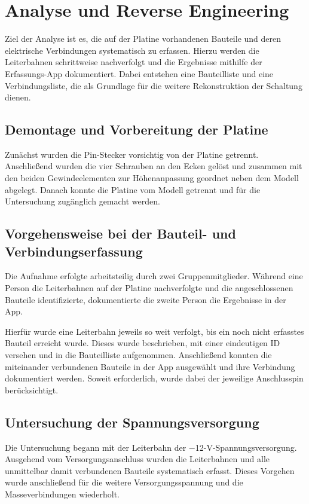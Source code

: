 \chapter{Analyse und Reverse Engineering}\label{ch:analyse-und-reverse-engineering}
Ziel der Analyse ist es, die auf der Platine vorhandenen Bauteile und deren elektrische Verbindungen systematisch zu erfassen.
Hierzu werden die Leiterbahnen schrittweise nachverfolgt und die Ergebnisse mithilfe der Erfassungs-App dokumentiert.
Dabei entstehen eine Bauteilliste und eine Verbindungsliste, die als Grundlage für die weitere Rekonstruktion der Schaltung dienen.

\section{Demontage und Vorbereitung der Platine}\label{sec:demontage-und-vorbereitung-der-platine}
Zunächst wurden die Pin-Stecker vorsichtig von der Platine getrennt.
Anschließend wurden die vier Schrauben an den Ecken gelöst und zusammen mit den beiden Gewindeelementen zur Höhenanpassung geordnet neben dem Modell abgelegt.
Danach konnte die Platine vom Modell getrennt und für die Untersuchung zugänglich gemacht werden.

\section{Vorgehensweise bei der Bauteil- und Verbindungserfassung}\label{sec:vorgehensweise-bei-der-bauteil--und-verbindungserfassung}
Die Aufnahme erfolgte arbeitsteilig durch zwei Gruppenmitglieder.
Während eine Person die Leiterbahnen auf der Platine nachverfolgte und die angeschlossenen Bauteile identifizierte, dokumentierte die zweite Person die Ergebnisse in der App.

Hierfür wurde eine Leiterbahn jeweils so weit verfolgt, bis ein noch nicht erfasstes Bauteil erreicht wurde.
Dieses wurde beschrieben, mit einer eindeutigen ID versehen und in die Bauteilliste aufgenommen.
Anschließend konnten die miteinander verbundenen Bauteile in der App ausgewählt und ihre Verbindung dokumentiert werden.
Soweit erforderlich, wurde dabei der jeweilige Anschlusspin berücksichtigt.

\section{Untersuchung der Spannungsversorgung}\label{sec:untersuchung-der-spannungsversorgung}
Die Untersuchung begann mit der Leiterbahn der −12-V-Spannungsversorgung.
Ausgehend vom Versorgungsanschluss wurden die Leiterbahnen und alle unmittelbar damit verbundenen Bauteile systematisch erfasst.
Dieses Vorgehen wurde anschließend für die weitere Versorgungsspannung und die Masseverbindungen wiederholt.

